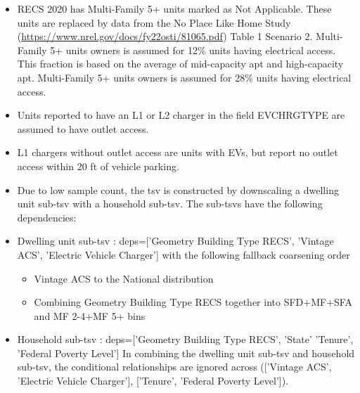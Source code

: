 \begin{itemize}
\item RECS 2020 has Multi-Family 5+ units marked as Not Applicable. These units are replaced by data from the No Place Like Home Study (\href{https://www.nrel.gov/docs/fy22osti/81065.pdf}{https://www.nrel.gov/docs/fy22osti/81065.pdf}) Table 1 Scenario 2. Multi-Family 5+ units owners is assumed for 12\% units having electrical access. This fraction is based on the average of mid-capacity apt and high-capacity apt. Multi-Family 5+ units owners is assumed for 28\% units having electrical access.
\item Units reported to have an L1 or L2 charger in the field EVCHRGTYPE are assumed to have outlet access.
\item L1 chargers without outlet access are units with EVs, but report no outlet access within 20 ft of vehicle parking.
\item Due to low sample count, the tsv is constructed by downscaling a dwelling unit sub-tsv with a household sub-tsv. The sub-tsvs have the following dependencies:
\item Dwelling unit sub-tsv : deps=['Geometry Building Type RECS', 'Vintage ACS', 'Electric Vehicle Charger'] with the following fallback coarsening order
  \begin{itemize}
  \item Vintage ACS to the National distribution
  \item Combining Geometry Building Type RECS together into SFD+MF+SFA and MF 2-4+MF 5+ bins
  \end{itemize}
\item Household sub-tsv : deps=['Geometry Building Type RECS', 'State' 'Tenure', 'Federal Poverty Level'] In combining the dwelling unit sub-tsv and household sub-tsv, the conditional relationships are ignored across (['Vintage ACS', 'Electric Vehicle Charger'], ['Tenure', 'Federal Poverty Level']).
\end{itemize}
